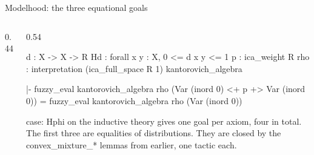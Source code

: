 \documentclass[10pt,aspectratio=169]{beamer}
\newcommand{\rid}[1]{{\ttfamily\small #1}}
\begin{document}
            \begin{frame}[fragile]{Modelhood: the three equational goals}
                \begin{columns}[T]
                    \begin{column}{0.44\textwidth}
                    \end{column}
                    \begin{column}{0.54\textwidth}
                        \begin{goalbox}[title={Goal 1 / 4 \quad (ICA\_Idem)}]
                            \begin{gctx}
d : X -> X -> R
Hd : forall x y : X, 0 <= d x y <= 1
p : ica_weight R
rho : interpretation (ica_full_space R 1)
        kantorovich_algebra
                            \end{gctx}
                            \tcblower
                            \begin{gconc}
|- fuzzy_eval kantorovich_algebra rho
     (Var (inord 0) <+ p +> Var (inord 0)) =
   fuzzy_eval kantorovich_algebra rho (Var (inord 0))
                            \end{gconc}
                        \end{goalbox}
                        \smallskip
                        {\footnotesize \rid{case: Hphi} on the
                            inductive theory gives one
                            goal per axiom, four in total.
                            \\[0.5em]
                            The first three are equalities of
                            distributions. They are
                            closed by the \rid{convex\_mixture\_*}
                            lemmas from earlier, one
                        tactic each.}
                    \end{column}
                \end{columns}
            \end{frame}
\end{document}
